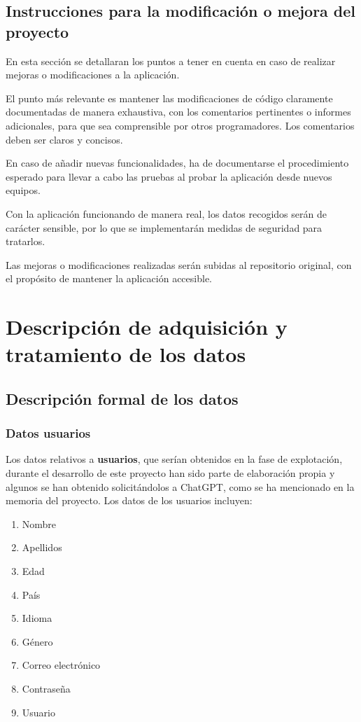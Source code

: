 \documentclass[a4paper,12pt,twoside]{memoir}
\newcommand{\apendice}[1]{
	\chapter{#1}
}
\begin{document}
\section{Instrucciones para la modificación o mejora del proyecto}
En esta sección se detallaran los puntos a tener en cuenta en caso de realizar mejoras o modificaciones a la aplicación.

El punto más relevante es mantener las modificaciones de código claramente documentadas de manera exhaustiva, con los comentarios pertinentes o informes adicionales, para que sea comprensible por otros programadores. Los comentarios deben ser claros y concisos.

En caso de añadir nuevas funcionalidades, ha de documentarse el procedimiento esperado para llevar a cabo las pruebas al probar la aplicación desde nuevos equipos.

Con la aplicación funcionando de manera real, los datos recogidos serán de carácter sensible, por lo que se implementarán medidas de seguridad para tratarlos.

Las mejoras o modificaciones realizadas serán subidas al repositorio original, con el propósito de mantener la aplicación accesible.

\apendice{Descripción de adquisición y tratamiento de los datos}
\section{Descripción formal de los datos}
\subsection{Datos usuarios}
Los datos relativos a \textbf{usuarios}, que serían obtenidos en la fase de explotación, durante el desarrollo de este proyecto han sido parte de elaboración propia y algunos se han obtenido solicitándolos a ChatGPT, como se ha mencionado en la memoria del proyecto. Los datos de los usuarios incluyen:
\begin{enumerate}
    \item Nombre
    \item Apellidos
    \item Edad
    \item País
    \item Idioma
    \item Género
    \item Correo electrónico
    \item Contraseña
    \item Usuario
\end{enumerate}
\end{document}
